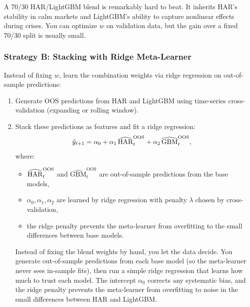 \begin{keyidea}
A 70/30 HAR/LightGBM blend is remarkably hard to beat.  It inherits HAR's
stability in calm markets and LightGBM's ability to capture nonlinear
effects during crises.  You can optimize $w$ on validation data, but the
gain over a fixed 70/30 split is usually small.
\end{keyidea}

\subsubsection{Strategy B: Stacking with Ridge Meta-Learner}

Instead of fixing $w$, learn the combination weights via ridge regression
on out-of-sample predictions:

\begin{enumerate}
  \item Generate OOS predictions from HAR and LightGBM using
        time-series cross-validation (expanding or rolling window).
  \item Stack these predictions as features and fit a ridge regression:
        \begin{equation}\label{eq:stacking}
          \hat{y}_{t+1} = \alpha_0 + \alpha_1\,\widehat{\operatorname{HAR}}_t^{\text{OOS}}
            + \alpha_2\,\widehat{\text{GBM}}_t^{\text{OOS}},
        \end{equation}
        where:
        \begin{itemize}
          \item $\widehat{\operatorname{HAR}}_t^{\text{OOS}}$ and
                $\widehat{\text{GBM}}_t^{\text{OOS}}$ are out-of-sample
                predictions from the base models,
          \item $\alpha_0, \alpha_1, \alpha_2$ are learned by ridge
                regression with penalty $\lambda$ chosen by
                cross-validation,
          \item the ridge penalty prevents the meta-learner from
                overfitting to the small differences between base
                models.
        \end{itemize}

        \begin{intuition}
        Instead of fixing the blend weights by hand, you let the data
        decide.  You generate out-of-sample predictions from each base
        model (so the meta-learner never sees in-sample fits), then run
        a simple ridge regression that learns how much to trust each
        model.  The intercept $\alpha_0$ corrects any systematic bias,
        and the ridge penalty prevents the meta-learner from overfitting
        to noise in the small differences between HAR and LightGBM.
        \end{intuition}


\end{enumerate}
